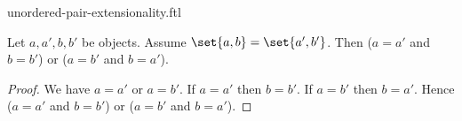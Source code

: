 \documentclass{stex}
\begin{document}
\begin{smodule}{unordered-pair-extensionality.ftl}

  \begin{forthel}
  \end{forthel}

  \begin{forthel}
    \begin{proposition}
      Let $a, a', b, b'$ be objects.
      Assume $\set{a, b} = \set{a', b'}$.
      Then ($a = a'$ and $b = b'$) or ($a = b'$ and $b = a'$).
    \end{proposition}
    \begin{proof}
      We have $a = a'$ or $a = b'$.
      If $a = a'$ then $b = b'$.
      If $a = b'$ then $b = a'$.
      Hence ($a = a'$ and $b = b'$) or ($a = b'$ and $b = a'$).
    \end{proof}
  \end{forthel}
\end{smodule}
\end{document}
